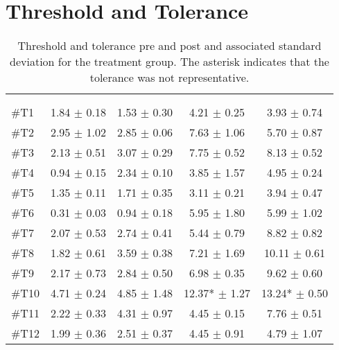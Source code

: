\chapter{Threshold and Tolerance} \label{ThresTolA}

\begin{longtable} {l|c|c|c|c}
	\caption{Threshold and tolerance pre and post and associated standard deviation for the treatment group. The asterisk indicates that the tolerance was not representative.}
	\label{tab:TreatmentA} \\
\cellcolor[HTML]{C0C0C0} {} & 
\multicolumn{2}{c|}{ \cellcolor[HTML]{C0C0C0}{\textbf{Threshold}}} & \multicolumn{2}{c}{ \cellcolor[HTML]{C0C0C0}{\textbf{Tolerance}}}  	\\  \rule{0pt}{3ex} 
  \cellcolor[HTML]{C0C0C0}{} &
 \multicolumn{1}{c|}{ \cellcolor[HTML]{C0C0C0}{Pre [KgF]}} & \multicolumn{1}{c|}{ \cellcolor[HTML]{C0C0C0}{Post [KgF]}} 
 & \multicolumn{1}{|c|}{ \cellcolor[HTML]{C0C0C0}{Pre [KgF]}} 
 & \multicolumn{1}{c|}{ \cellcolor[HTML]{C0C0C0}{Post [KgF]}} 	\\ \hline 
\#T1 & 1.84 $\pm$ 0.18 & 1.53 $\pm$ 0.30 & 4.21 $\pm$ 0.25 & 3.93 $\pm$ 0.74 \\ \hline
\#T2 & 2.95 $\pm$ 1.02 & 2.85 $\pm$ 0.06 & 7.63 $\pm$ 1.06  & 5.70 $\pm$ 0.87 \\ \hline
\#T3 & 2.13 $\pm$ 0.51 & 3.07 $\pm$ 0.29 & 7.75 $\pm$ 0.52 & 8.13 $\pm$ 0.52 \\ \hline
\#T4 & 0.94 $\pm$ 0.15 & 2.34 $\pm$ 0.10 & 3.85 $\pm$ 1.57 & 4.95 $\pm$ 0.24 \\ \hline
\#T5 & 1.35 $\pm$ 0.11 & 1.71 $\pm$ 0.35 & 3.11 $\pm$ 0.21  & 3.94 $\pm$ 0.47 \\ \hline	
\#T6 & 0.31 $\pm$ 0.03 & 0.94 $\pm$ 0.18 & 5.95 $\pm$ 1.80 & 5.99 $\pm$  1.02\\ \hline
\#T7 & 2.07 $\pm$ 0.53  & 2.74 $\pm$ 0.41 & 5.44 $\pm$ 0.79 & 8.82 $\pm$ 0.82  \\ \hline
\#T8 & 1.82 $\pm$ 0.61 & 3.59 $\pm$ 0.38 & 7.21 $\pm$ 1.69 & 10.11 $\pm$ 0.61 \\ \hline
\#T9 & 2.17 $\pm$ 0.73 & 2.84 $\pm$ 0.50 & 6.98 $\pm$  0.35 & 9.62 $\pm$ 0.60 \\ \hline
\#T10 & 4.71 $\pm$ 0.24 & 4.85 $\pm$ 1.48  & 12.37*  $\pm$ 1.27  & 13.24* $\pm$ 0.50  \\ \hline
\#T11 & 2.22 $\pm$ 0.33 & 4.31 $\pm$ 0.97 & 4.45 $\pm$ 0.15 & 7.76 $\pm$  0.51 \\ \hline
\#T12 & 1.99 $\pm$ 0.36 & 2.51 $\pm$ 0.37  & 4.45 $\pm$ 0.91  & 4.79 $\pm$ 1.07  \\ \hline

\end{longtable}
